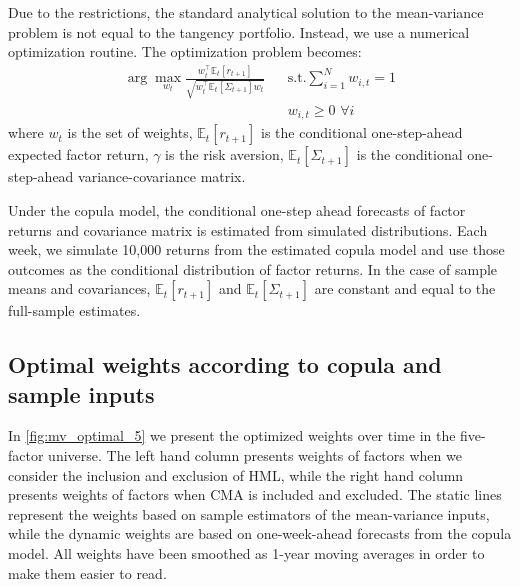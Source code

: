 
Due to the restrictions, the standard analytical solution to the mean-variance problem is not equal to the tangency portfolio. Instead, we use a numerical optimization routine. The optimization problem becomes:
\begin{align*}
  \arg\!\max_{w_t} \frac{w_t^\top \mathbb{E}_t[r_{t+1}]}{\sqrt{w_t^\top \mathbb{E}_t[\Sigma_{t+1}] w_t}}
    && \text{s.t.} \sum_{i=1}^N w_{i,t} = 1 \\
    && w_{i,t} \ge 0 \,\, \forall i
\end{align*}
where $w_t$ is the set of weights, $\mathbb{E}_t[r_{t+1}]$ is the conditional one-step-ahead expected factor return, $\gamma$ is the risk aversion, $\mathbb{E}_t[\Sigma_{t+1}]$ is the conditional one-step-ahead variance-covariance matrix. 

Under the copula model, the conditional one-step ahead forecasts of factor returns and covariance matrix is estimated from simulated distributions. Each week, we simulate 10,000 returns from the estimated copula model and use those outcomes as the conditional distribution of factor returns. In the case of sample means and covariances, $\mathbb{E}_t[r_{t+1}]$ and $\mathbb{E}_t[\Sigma_{t+1}]$ are constant and equal to the full-sample estimates.

\subsection{Optimal weights according to copula and sample inputs}
In \autoref{fig:mv_optimal_5} we present the optimized weights over time in the five-factor universe. The left hand column presents weights of factors when we consider the inclusion and exclusion of HML, while the right hand column presents weights of factors when CMA is included and excluded. The static lines represent the weights based on sample estimators of the mean-variance inputs, while the dynamic weights are based on one-week-ahead forecasts from the copula model. All weights have been smoothed as 1-year moving averages in order to make them easier to read. 

